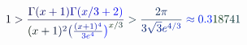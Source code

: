 \documentclass[12pt]{article}
\begin{document}
\makeatletter
\renewcommand*{\@textcolor}[3]{%
  \protect\leavevmode
  \begingroup
    \color#1{#2}#3%
  \endgroup
}
\makeatother
\begin{displaymath}
\mathcolor[RGB]{0,0,15}{1} \mathcolor[RGB]{0,0,30}{>} \mathcolor[RGB]{0,0,45}{\frac { \mathcolor[RGB]{0,0,60}{\Gamma} \mathcolor[RGB]{0,0,75}{(} \mathcolor[RGB]{0,0,90}{x} \mathcolor[RGB]{0,0,105}{+} \mathcolor[RGB]{0,0,120}{1} \mathcolor[RGB]{0,0,135}{)} \mathcolor[RGB]{0,0,150}{\Gamma} \mathcolor[RGB]{0,0,165}{(} \mathcolor[RGB]{0,0,180}{x} \mathcolor[RGB]{0,0,195}{/} \mathcolor[RGB]{0,0,210}{3} \mathcolor[RGB]{0,0,225}{+} \mathcolor[RGB]{0,0,240}{2} \mathcolor[RGB]{0,0,255}{)} } { \mathcolor[RGB]{0,15,0}{(} \mathcolor[RGB]{0,15,15}{x} \mathcolor[RGB]{0,15,30}{+} \mathcolor[RGB]{0,15,45}{1} \mathcolor[RGB]{0,15,60}{)} ^ { \mathcolor[RGB]{0,15,75}{2} } \mathcolor[RGB]{0,15,90}{\bigl(} \mathcolor[RGB]{0,15,105}{\frac { \mathcolor[RGB]{0,15,120}{(} \mathcolor[RGB]{0,15,135}{x} \mathcolor[RGB]{0,15,150}{+} \mathcolor[RGB]{0,15,165}{1} \mathcolor[RGB]{0,15,180}{)} ^ { \mathcolor[RGB]{0,15,195}{4} } } { \mathcolor[RGB]{0,15,210}{3} \mathcolor[RGB]{0,15,225}{e} ^ { \mathcolor[RGB]{0,15,240}{4} } } } \mathcolor[RGB]{0,15,255}{\bigr)} ^ { \mathcolor[RGB]{0,30,0}{x} \mathcolor[RGB]{0,30,15}{/} \mathcolor[RGB]{0,30,30}{3} } } } \mathcolor[RGB]{0,30,45}{>} \mathcolor[RGB]{0,30,60}{\frac { \mathcolor[RGB]{0,30,75}{2} \mathcolor[RGB]{0,30,90}{\pi} } { \mathcolor[RGB]{0,30,105}{3} \mathcolor[RGB]{0,30,120}{\sqrt { \mathcolor[RGB]{0,30,135}{3} } } \mathcolor[RGB]{0,30,150}{e} ^ { \mathcolor[RGB]{0,30,165}{4} \mathcolor[RGB]{0,30,180}{/} \mathcolor[RGB]{0,30,195}{3} } } } \mathcolor[RGB]{0,30,210}{\approx} \mathcolor[RGB]{0,30,225}{0} \mathcolor[RGB]{0,30,240}{.} \mathcolor[RGB]{0,30,255}{3} \mathcolor[RGB]{0,45,0}{1} \mathcolor[RGB]{0,45,15}{8} \mathcolor[RGB]{0,45,30}{7} \mathcolor[RGB]{0,45,45}{4} \mathcolor[RGB]{0,45,60}{1}
\end{displaymath}
\end{document}
